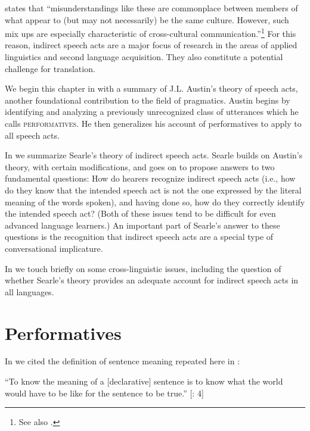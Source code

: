 \citet{Tannen1981} states that “misunderstandings like these are commonplace between members of what appear to (but may not necessarily) be the same culture. However, such mix ups are especially characteristic of cross-cultural communication.”\footnote{See also \citet{Tannen1975,Tannen1986}.} For this reason, indirect speech acts are a major focus of research in the areas of applied linguistics and second language acquisition. They also constitute a potential challenge for translation.



We begin this chapter in  with a summary of J.L. Austin’s theory of speech acts, another foundational contribution to the field of pragmatics. Austin begins by identifying and analyzing a previously unrecognized class of utterances which he calls \textsc{performatives}. He then generalizes his account of performatives to apply to all speech acts.



In  we summarize Searle’s theory of indirect speech acts. Searle builds on Austin’s theory, with certain modifications, and goes on to propose answers to two fundamental questions: How do hearers recognize indirect speech acts (i.e., how do they know that the intended speech act is not the one expressed by the literal meaning of the words spoken), and having done so, how do they correctly identify the intended speech act? (Both of these issues tend to be difficult for even advanced language learners.) An important part of Searle’s answer to these questions is the recognition that indirect speech acts are a special type of conversational implicature.



In  we touch briefly on some cross-linguistic issues, including the question of whether Searle’s theory provides an adequate account for indirect speech acts in all languages.


\section{Performatives}\footnotemark{}\label{sec:10.2}

In  we cited the definition of sentence meaning repeated here in :


\ea \label{ex:10.1}
“To know the meaning of a [declarative] sentence is to know what the world would have to be like for the sentence to be true.”  [\citealt{DowtyEtAl1981}: 4]
\z


